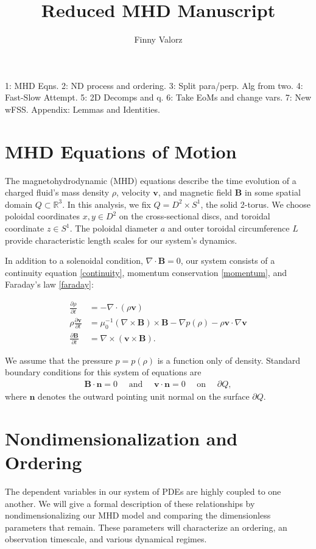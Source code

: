 \documentclass{article}
\title{Reduced MHD Manuscript}
\author{Finny Valorz}
\newcommand{\p}{\partial}
\newcommand{\deriv}[2]{\frac{\p #1}{\p #2}}
\newcommand{\pth} [1] {\left( #1 \right) }
\begin{document}
\maketitle



1: MHD Eqns. 2: ND process and ordering. 3: Split para/perp. Alg from two. 4: Fast-Slow Attempt. 5: 2D Decomps and q. 6: Take EoMs and change vars. 7: New wFSS. Appendix: Lemmas and Identities. 

\section{MHD Equations of Motion} 
The magnetohydrodynamic (MHD) equations describe the time evolution of a charged fluid's mass density $\rho$, velocity $\bm{v}$, and magnetic field $\bm{B}$ in some spatial domain $Q\subset \mathbb{R}^3$. In this analysis, we fix $Q=D^2\times S^1$, the solid 2-torus. We choose poloidal coordinates $x,y\in D^2$ on the cross-sectional discs, and toroidal coordinate $z \in S^1$. The poloidal diameter $a$ and outer toroidal circumference $L$ provide characteristic length scales for our system's dynamics. 

In addition to a solenoidal condition, $\nabla\cdot \bm{B}=0$, our system consists of a continuity equation \eqref{continuity}, momentum conservation \eqref{momentum}, and Faraday's law \eqref{faraday}:

\begin{align}
    \deriv{\rho}{t} &= -\nabla\cdot \pth{\rho \bm{v}} \label{continuity} \\ 
    \rho\deriv{\bm{v}}{t} &= \mu_0^{-1} \pth{\nabla\times \bm{B}} \times \bm{B} - \nabla p(\rho) - \rho \bm{v}\cdot\nabla \bm{v} \label{momentum} \\ 
    \deriv{\bm{B}}{t} &= \nabla \times \pth{\bm{v}\times \bm{B}}. \label{faraday}
\end{align}

We assume that the pressure $p=p(\rho)$ is a function only of density. Standard boundary conditions for this system of equations are
\begin{align} 
    \bm{B}\cdot \bm{n} = 0 \quad \text{ and }\quad  \bm{v}\cdot \bm{n} = 0 \quad \text{ on }\quad \p Q,
\end{align}
where $\bm{n}$ denotes the outward pointing unit normal on the surface $\p Q$. 



\section{Nondimensionalization and Ordering} 
The dependent variables in our system of PDEs are highly coupled to one another. We will give a formal description of these relationships by nondimensionalizing our MHD model and comparing the dimensionless parameters that remain. These parameters will characterize an ordering, an observation timescale, and various dynamical regimes. 
\end{document}
